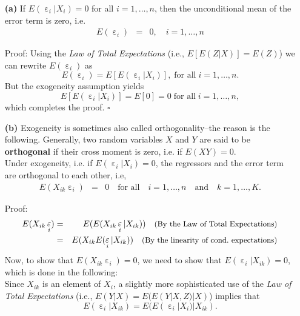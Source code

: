 \documentclass[
  14pt,
]{memoir}
\DeclareMathOperator{\eps}{\varepsilon}
\begin{document}
\begin{itemize}
\item[\textbf{(a)}] If $E(\eps_i|X_i)=0$ for all $i=1,\dots,n$, then the unconditional mean of the error term is zero, i.e.
\begin{eqnarray*}
  E(\eps_i)&=&0,\quad i=1,\dots,n
\end{eqnarray*}
\begin{mdframed}[hidealllines=true,backgroundcolor=blue!20]
Proof: %
Using the \emph{Law of Total Expectations} (i.e., $E[E(Z|X)]=E(Z)$) we can rewrite $E(\eps_i)$ as
$$E(\eps_i)=E[E(\eps_i|X_i)],\;\text{for all}\;i=1,\dots,n.$$
But the exogeneity assumption yields
$$E[E(\eps_i|X_i)]=E[0]=0\;\text{for all}\;i=1,\dots,n,$$
which completes the proof. $\square$
\end{mdframed}
\item[\textbf{(b)}] Exogeneity is sometimes also called orthogonality--the reason is the following.  Generally, two random variables $X$ and $Y$ are said to be \textbf{orthogonal} if their cross moment is zero, i.e. if $E(XY)=0$.\\[2ex] \noindent Under exogeneity, i.e. if $E(\eps_i|X_{i})=0$, the regressors and the error term are orthogonal to each other, i.e,
\begin{eqnarray*}
E(X_{ik}\eps_i)&=&0\quad\text{for all}\quad i=1,\dots,n\quad\text{and}\quad k=1,\dots,K.
\end{eqnarray*}
\begin{mdframed}[hidealllines=true,backgroundcolor=blue!20]
Proof: %
\begin{eqnarray*}
  E(X_{ik}\eps_i)&=&E(E(X_{ik}\eps_i|X_{ik}))\quad{\small\text{(By the Law of Total Expectations)}}\\
  &=&E(X_{ik}E(\eps_i|X_{ik}))\quad{\small\text{(By the linearity of cond.~expectations)}}
\end{eqnarray*}
Now, to show that $E(X_{ik}\eps_i)=0$, we need to show that $E(\eps_i|X_{ik})=0$, which is done in the following:\\
Since $X_{ik}$ is an element of $X_i$, a slightly more sophisticated use of the \emph{Law of Total Expectations} (i.e., $E(Y|X)=E(E(Y|X,Z)|X)$) implies that
$$E(\eps_i|X_{ik})=E(E(\eps_i|X_i)|X_{ik}).$$

\end{mdframed}
\end{itemize}
\end{document}
